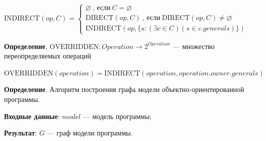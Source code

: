 $\textrm{INDIRECT}(op, C) = \begin{cases}
\varnothing \ \textrm{, если} \ C = \varnothing \\
\textrm{DIRECT}(op, C) \ \textrm{, если} \ \textrm{DIRECT}(op, C) \ne \varnothing \\
\textrm{INDIRECT}(op, \{ s : (\exists c \in C)(s \in c.generals) \})
\end{cases}
$

\textbf{Определение}. $\textrm{OVERRIDDEN}: Operation \to 2^{Operation}$
--- множество переопределяемых операций

$\textrm{OVERRIDDEN}(operation) = \textrm{INDIRECT}(operation, operation.owner.generals)$

\textbf{Определение}. Алгоритм построения графа модели объектно-ориентированной программы.

\textbf{Входные данные}: $model$ --- модель программы;

\textbf{Результат}: $G$ --- граф модели программы.

